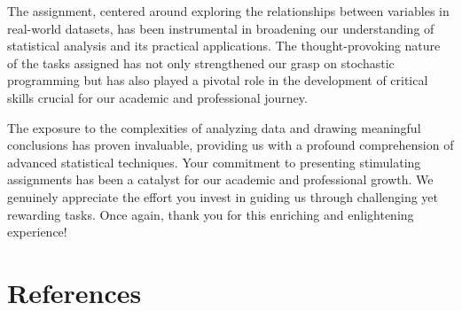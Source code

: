 \documentclass[a4paper]{article}
\begin{document}
	The assignment, centered around exploring the relationships between variables in real-world datasets, has been instrumental in broadening our understanding of statistical analysis and its practical applications. The thought-provoking nature of the tasks assigned has not only strengthened our grasp on stochastic programming but has also played a pivotal role in the development of critical skills crucial for our academic and professional journey.
	
	The exposure to the complexities of analyzing data and drawing meaningful conclusions has proven invaluable, providing us with a profound comprehension of advanced statistical techniques. Your commitment to presenting stimulating assignments has been a catalyst for our academic and professional growth. We genuinely appreciate the effort you invest in guiding us through challenging yet rewarding tasks. Once again, thank you for this enriching and enlightening experience!
	\newpage
	\section{References}
		
\end{document}
